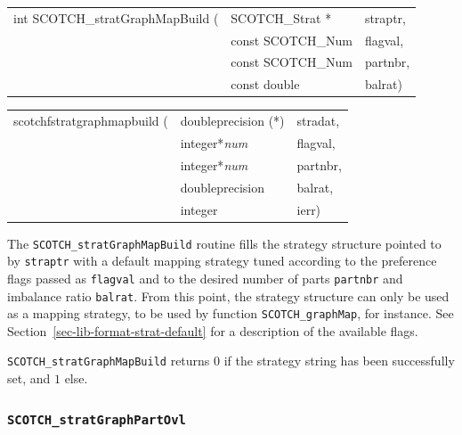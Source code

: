 \begin{itemize}
\progsyn

{\tt\begin{tabular}{l@{}ll}
int SCOTCH\_stratGraphMapBuild ( & SCOTCH\_Strat *   & straptr, \\
                                 & const SCOTCH\_Num & flagval, \\
                                 & const SCOTCH\_Num & partnbr, \\
                                 & const double      & balrat)
\end{tabular}}

{\tt\begin{tabular}{l@{}ll}
scotchfstratgraphmapbuild ( & doubleprecision (*) & stradat, \\
                            & integer*{\it num}   & flagval, \\
                            & integer*{\it num}   & partnbr, \\
                            & doubleprecision     & balrat,  \\
                            & integer             & ierr)
\end{tabular}}

\progdes

The {\tt SCOTCH\_stratGraphMapBuild} routine fills the strategy
structure pointed to by {\tt straptr} with a default mapping strategy
tuned according to the preference flags passed as {\tt flagval} and
to the desired number of parts {\tt partnbr} and imbalance ratio
{\tt balrat}. From this point, the strategy structure can only be used
as a mapping strategy, to be used by function
{\tt SCOTCH\_\lbt graph\lbt Map}, for instance. See
Section~\ref{sec-lib-format-strat-default} for a description of the
available flags.

\progret

{\tt SCOTCH\_stratGraphMapBuild} returns $0$ if the strategy string
has been successfully set, and $1$ else.
\end{itemize}

\subsubsection{{\tt SCOTCH\_stratGraphPartOvl}}
\label{sec-lib-func-stratgraphpartovl}

